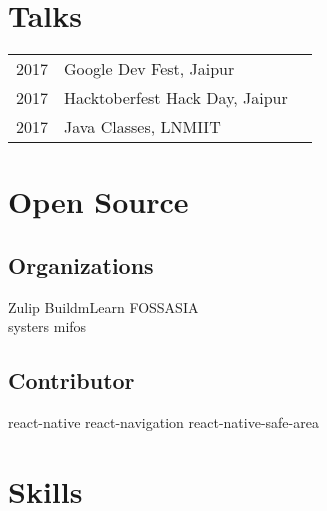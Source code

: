 \documentclass[a4paper]{deedy-resume} %
\begin{document}
\begin{minipage}[t]{0.33\textwidth}
\sectionspace %


\section{Talks}

\begin{tabular}{rll}
2017 & Google Dev Fest, Jaipur\\
2017 & Hacktoberfest Hack Day, Jaipur\\
2017 & Java Classes, LNMIIT\\
\end{tabular}

\sectionspace %


\section{Open Source}
\subsection{Organizations}

Zulip \textbullet{} BuildmLearn  \textbullet{} FOSSASIA \\
systers \textbullet{} mifos \\

\sectionspace %

\subsection{Contributor}

\textbullet{} react-native
\textbullet{} react-navigation
\textbullet{} react-native-safe-area

\sectionspace %


\section{Skills}


\end{minipage}
\end{document}
